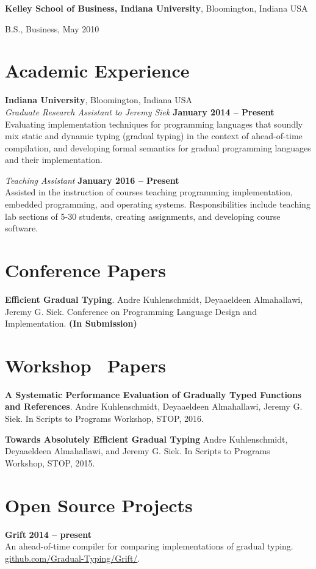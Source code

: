 \documentclass[margin,line]{res}
\newenvironment{list1}{
  \begin{list}{\ding{113}}{%
      \setlength{\itemsep}{0in}
      \setlength{\parsep}{0in} \setlength{\parskip}{0in}
      \setlength{\topsep}{0in} \setlength{\partopsep}{0in} 
      \setlength{\leftmargin}{0.17in}}}{\end{list}}
\begin{document}
\begin{resume}
{\bf Kelley School of Business, Indiana University}, Bloomington, Indiana USA\\
\vspace*{-.1in}
\begin{list1}
\item[] B.S., Business, May 2010
\end{list1}

\section{\sc Academic Experience}
{\bf Indiana University}, Bloomington, Indiana USA\\
{\em Graduate Research Assistant to Jeremy Siek} \hfill {\bf January 2014 -- Present}\\
%
Evaluating implementation techniques for programming
languages that soundly mix static and dynamic typing (gradual typing)
in the context of ahead-of-time compilation, and developing formal
semantics for gradual programming languages and their implementation.

{\em Teaching Assistant} \hfill {\bf January 2016 -- Present}\\
%
Assisted in the instruction of courses teaching programming
implementation, embedded programming, and operating
systems. Responsibilities include teaching lab sections of 5-30
students, creating assignments, and developing course software.

\section{\sc Conference Papers}

{\bf Efficient Gradual Typing}.
%
Andre Kuhlenschmidt, Deyaaeldeen Almahallawi, Jeremy G. Siek.
%
Conference on Programming Language Design and Implementation.
{\bf (In Submission)}

\section{\sc Workshop \, Papers}

{\bf A Systematic Performance Evaluation of Gradually Typed Functions
  and References}.
%
Andre Kuhlenschmidt, Deyaaeldeen Almahallawi, Jeremy G. Siek.
%
In Scripts to Programs Workshop, STOP, 2016.

{\bf Towards Absolutely Efficient Gradual Typing}
%
Andre Kuhlenschmidt, Deyaaeldeen Almahallawi, and Jeremy G. Siek.
%
In Scripts to Programs Workshop, STOP, 2015.

\section{\sc Open Source Projects}

{\bf Grift} \hfill {\bf 2014 -- present}\\
%
An ahead-of-time compiler for comparing implementations of gradual
typing.\\
%
\url{github.com/Gradual-Typing/Grift/}.

\end{resume}
\end{document}
